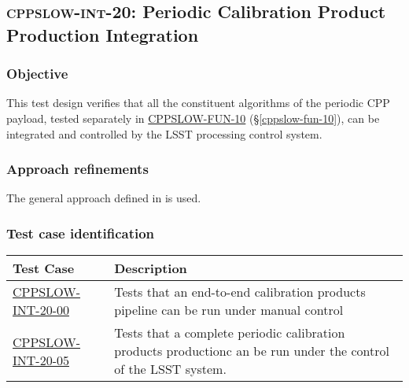 \subsection{\textsc{cppslow-int-20}: Periodic Calibration Product Production Integration}
\label{cppslow-int-20}

\subsubsection{Objective}

This test design verifies that all the constituent algorithms of the periodic
CPP payload, tested separately in \hyperref[cppslow-fun-10]{CPPSLOW-FUN-10}
(\S\ref{cppslow-fun-10}), can be integrated and controlled by the LSST
processing control system.

\subsubsection{Approach refinements}

The general approach defined in  is used.

\subsubsection{Test case identification}

\begin{longtable} {|p{}|p{}|}\hline
\textbf{Test Case}  & \textbf{Description} \\\hline

\hyperref[cppslow-int-20-00]{CPPSLOW-INT-20-00} & Tests that an end-to-end calibration products pipeline can be run under manual control \\\hline
\hyperref[cppslow-int-20-05]{CPPSLOW-INT-20-05} & Tests that a complete periodic calibration products productionc an be run under the control of the LSST system.\\\hline
\end{longtable}
